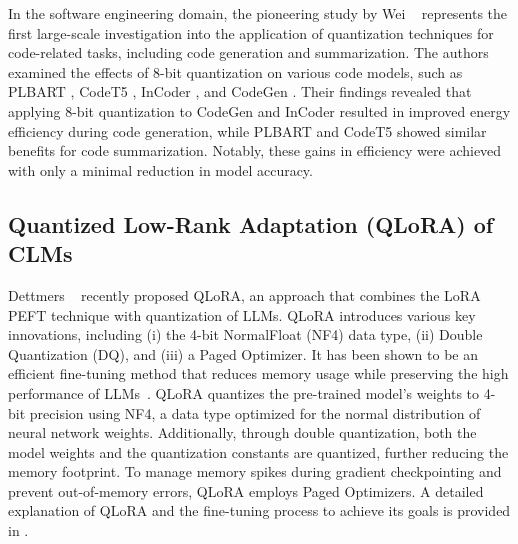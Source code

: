 
In the software engineering domain, the pioneering study by Wei \etal~\cite{wei2023towards} represents the first large-scale investigation into the application of quantization techniques for code-related tasks, including code generation and summarization. The authors examined the effects of 8-bit quantization on various code models, such as PLBART \cite{ahmad2021unified}, CodeT5 \cite{wang2021codet5}, InCoder \cite{fried2022incoder}, and CodeGen \cite{nijkamp2022codegen}. Their findings revealed that applying 8-bit quantization to CodeGen and InCoder resulted in improved energy efficiency during code generation, while PLBART and CodeT5 showed similar benefits for code summarization. Notably, these gains in efficiency were achieved with only a minimal reduction in model accuracy.


\subsection{Quantized Low-Rank Adaptation (QLoRA) of CLMs}
\label{sec:qlora}

Dettmers \etal~\cite{dettmers2024qlora} recently proposed QLoRA, an approach that combines the LoRA PEFT technique with quantization of LLMs. QLoRA introduces various key innovations, including (i) the 4-bit NormalFloat (NF4) data type, (ii) Double Quantization (DQ), and (iii) a Paged Optimizer. It has been shown to be an efficient fine-tuning method that reduces memory usage while preserving the high performance of LLMs~\cite{dettmers2024qlora}. QLoRA quantizes the pre-trained model’s weights to 4-bit precision using NF4, a data type optimized for the normal distribution of neural network weights. Additionally, through double quantization, both the model weights and the quantization constants are quantized, further reducing the memory footprint. To manage memory spikes during gradient checkpointing and prevent out-of-memory errors, QLoRA employs Paged Optimizers. A detailed explanation of QLoRA and the fine-tuning process to achieve its goals is provided in .

